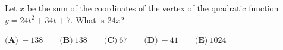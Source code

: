 Let $x$ be the sum of the coordinates of the vertex of the quadratic function $y=24t^2+34t+7$. What is $24x$?

$\textbf{(A)}~-138\qquad\textbf{(B)}~138\qquad\textbf{(C)}~67\qquad\textbf{(D)}~-41\qquad\textbf{(E)}~1024\qquad$
